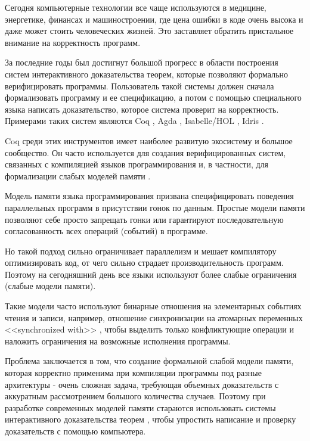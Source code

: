 \documentclass[times
              ,specification
              ,annotation
              ]{itmo-student-thesis}
\begin{document}
  Сегодня компьютерные технологии все чаще используются в медицине, энергетике, финансах и
  машиностроении, где цена ошибки в коде очень высока и даже может стоить человеческих жизней.
  Это заставляет обратить пристальное внимание на корректность программ.

  За последние годы был достигнут большой прогресс в области построения систем интерактивного
  доказательства теорем, которые позволяют формально верифицировать программы.
  Пользователь такой системы должен сначала формализовать программу и ее спецификацию, а потом с помощью
  специального языка написать доказательство, которое система проверит на корректность.
  Примерами таких систем являются Coq \cite{intro_to_coq}, Agda \cite{agda}, Isabelle/HOL \cite{hol},
  Idris \cite{idris}.

  Coq среди этих инструментов имеет наиболее развитую экосистему и большое сообщество.
  Он часто используется для создания верифицированных систем, связанных с компиляцией языков
  программирования \cite{comp-cert, vellvm} и, в частности, для формализации слабых моделей
  памяти \cite{rc11, imm}.

  Модель памяти языка программирования призвана специфицировать поведения параллельных программ в
  присутствии гонок по данным.
  Простые модели памяти позволяют себе просто запрещать гонки или гарантируют последовательную
  согласованность всех операций (событий) в программе.

  Но такой подход сильно ограничивает параллелизм и мешает компилятору оптимизировать код, от чего сильно
  страдает производительность программ.
  Поэтому на сегодняшний день все языки используют более слабые ограничения (слабые модели памяти).

  Такие модели часто используют бинарные отношения на элементарных событиях чтения и записи, например,
  отношение синхронизации на атомарных переменных <<synchronized with>> \cite{rc11}, чтобы выделить только
  конфликтующие операции и наложить ограничения на возможные исполнения программы.

  Проблема заключается в том, что создание формальной слабой модели памяти, которая корректно применима
  при компиляции программы под разные архитектуры - очень сложная задача, требующая объемных
  доказательств с аккуратным рассмотрением большого количества случаев.
  Поэтому при разработке современных моделей памяти стараются использовать системы интерактивного
  доказательства теорем \cite{rc11}, чтобы упростить написание и проверку доказательств с помощью
  компьютера.
\end{document}
